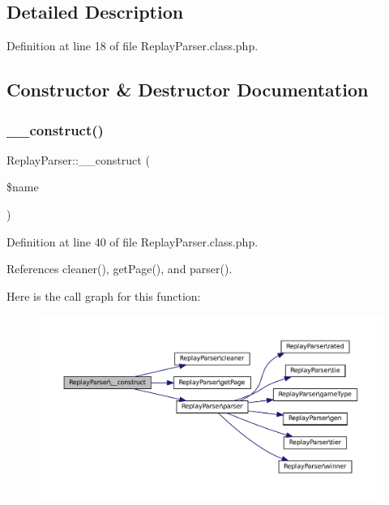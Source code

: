\subsection{Detailed Description}


Definition at line 18 of file Replay\+Parser.\+class.\+php.



\subsection{Constructor \& Destructor Documentation}
\mbox{\label{class_replay_parser_abcbfafc44c90244cafe255f1d8746b6c}} 
\subsubsection{\texorpdfstring{\+\_\+\+\_\+construct()}{\_\_construct()}}
{\footnotesize\ttfamily Replay\+Parser\+::\+\_\+\+\_\+construct (\begin{DoxyParamCaption}\item[{}]{\$name }\end{DoxyParamCaption})}



Definition at line 40 of file Replay\+Parser.\+class.\+php.



References cleaner(), get\+Page(), and parser().

Here is the call graph for this function\+:\nopagebreak
\begin{figure}[H]
\begin{center}
\leavevmode
\includegraphics[width=350pt]{class_replay_parser_abcbfafc44c90244cafe255f1d8746b6c_cgraph}
\end{center}
\end{figure}


